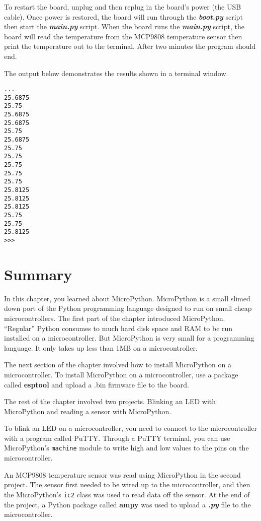 \documentclass{book}
\newcommand{\passthrough}[1]{#1}
\begin{document}
To restart the board, unplug and then replug in the board's power (the
USB cable). Once power is restored, the board will run through the
\textbf{\emph{boot.py}} script then start the \textbf{\emph{main.py}}
script. When the board runs the \textbf{\emph{main.py}} script, the
board will read the temperature from the MCP9808 temperature sensor then
print the temperature out to the terminal. After two minutes the program
should end.

The output below demonstrates the results shown in a terminal window.

\begin{lstlisting}
...
25.6875
25.75
25.6875
25.6875
25.75
25.6875
25.75
25.75
25.75
25.75
25.75
25.8125
25.8125
25.8125
25.75
25.75
25.8125
>>>
\end{lstlisting}
    




    
        \newpage
        \hypertarget{summary}{%
\section{Summary}\label{summary}}

    




    
        In this chapter, you learned about MicroPython. MicroPython is a small
slimed down port of the Python programming language designed to run on
small cheap microcontrollers. The first part of the chapter introduced
MicroPython. ``Regular'' Python consumes to much hard disk space and RAM
to be run installed on a microcontroller. But MicroPython is very small
for a programming language. It only takes up less than 1MB on a
microcontroller.

The next section of the chapter involved how to install MicroPython on a
microcontroller. To install MicroPython on a microcontroller, use a
package called \textbf{esptool} and upload a .bin firmware file to the
board.

The rest of the chapter involved two projects. Blinking an LED with
MicroPython and reading a sensor with MicroPython.

To blink an LED on a microcontroller, you need to connect to the
microcontroller with a program called PuTTY. Through a PuTTY terminal,
you can use MicroPython's \passthrough{\lstinline!machine!} module to
write high and low values to the pins on the microcontroller.

An MCP9808 temperature sensor was read using MicroPython in the second
project. The sensor first needed to be wired up to the microcontroller,
and then the MicroPython's \passthrough{\lstinline!ic2!} class was used
to read data off the sensor. At the end of the project, a Python package
called \textbf{ampy} was used to upload a \textbf{\emph{.py}} file to
the microcontroller.
    
\end{document}
